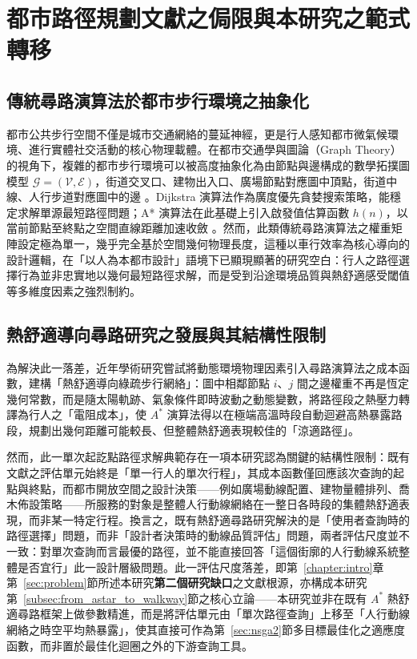 \section{都市路徑規劃文獻之侷限與本研究之範式轉移}
\label{sec:pathfinding_review}

\subsection{傳統尋路演算法於都市步行環境之抽象化}
\label{subsec:pathfinding_abstract}

都市公共步行空間不僅是城市交通網絡的蔓延神經，更是行人感知都市微氣候環境、進行實體社交活動的核心物理載體。在都市交通學與圖論（Graph Theory）的視角下，複雜的都市步行環境可以被高度抽象化為由節點與邊構成的數學拓撲圖模型 $\mathcal{G} = (\mathcal{V}, \mathcal{E})$，街道交叉口、建物出入口、廣場節點對應圖中頂點，街道中線、人行步道對應圖中的邊 \citep{hart1968formal}。Dijkstra 演算法作為廣度優先貪婪搜索策略，能穩定求解單源最短路徑問題；A* 演算法在此基礎上引入啟發值估算函數 $h(n)$，以當前節點至終點之空間直線距離加速收斂 \citep{hart1968formal}。然而，此類傳統尋路演算法之權重矩陣設定極為單一，幾乎完全基於空間幾何物理長度，這種以車行效率為核心導向的設計邏輯，在「以人為本都市設計」語境下已顯現顯著的研究空白：行人之路徑選擇行為並非忠實地以幾何最短路徑求解，而是受到沿途環境品質與熱舒適感受閾值等多維度因素之強烈制約。


\subsection{熱舒適導向尋路研究之發展與其結構性限制}
\label{subsec:thermal_comfort_path}

為解決此一落差，近年學術研究嘗試將動態環境物理因素引入尋路演算法之成本函數，建構「熱舒適導向綠疏步行網絡」\citep{coccolo2018thermal,lopezcabeza2025open}：圖中相鄰節點 $i$、$j$ 間之邊權重不再是恆定幾何常數，而是隨太陽軌跡、氣象條件即時波動之動態變數，將路徑段之熱壓力轉譯為行人之「電阻成本」\citep{lopezcabeza2025open}，使 $A^*$ 演算法得以在極端高溫時段自動迴避高熱暴露路段，規劃出幾何距離可能較長、但整體熱舒適表現較佳的「涼適路徑」。

然而，此一單次起訖點路徑求解典範存在一項本研究認為關鍵的結構性限制：既有文獻之評估單元始終是「單一行人的單次行程」，其成本函數僅回應該次查詢的起點與終點，而都市開放空間之設計決策——例如廣場動線配置、建物量體排列、喬木佈設策略——所服務的對象是整體人行動線網絡在一整日各時段的集體熱舒適表現，而非某一特定行程。換言之，既有熱舒適尋路研究解決的是「使用者查詢時的路徑選擇」問題，而非「設計者決策時的動線品質評估」問題，兩者評估尺度並不一致：對單次查詢而言最優的路徑，並不能直接回答「這個街廓的人行動線系統整體是否宜行」此一設計層級問題。此一評估尺度落差，即第~\ref{chapter:intro}章第~\ref{sec:problem}節所述本研究\textbf{第二個研究缺口}之文獻根源，亦構成本研究第~\ref{subsec:from_astar_to_walkway}節之核心立論——本研究並非在既有 $A^*$ 熱舒適尋路框架上做參數精進，而是將評估單元由「單次路徑查詢」上移至「人行動線網絡之時空平均熱暴露」，使其直接可作為第~\ref{sec:nsga2}節多目標最佳化之適應度函數，而非置於最佳化迴圈之外的下游查詢工具。

